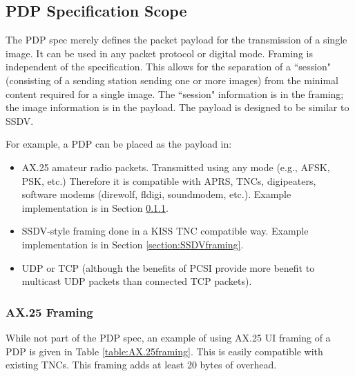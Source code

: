 \documentclass[letterpaper]{article}
\begin{document}
\subsection {PDP Specification Scope}
The PDP spec merely defines the packet payload for the transmission of a single image. It can be used in any packet protocol or digital mode. Framing is independent of the specification. This allows for the separation of a ``session" (consisting of a sending station sending one or more images) from the minimal content required for a single image. The ``session" information is in the framing; the image information is in the payload. The payload is designed to be similar to SSDV.

For example, a PDP can be placed as the payload in:
\begin{itemize}
    \item AX.25 amateur radio packets. Transmitted using any mode (e.g., AFSK, PSK, etc.) Therefore it is compatible with APRS, TNCs, digipeaters, software modems (direwolf, fldigi, soundmodem, etc.). Example implementation is in Section \ref{section:AX.25framing}.
    \item SSDV-style framing done in a KISS TNC compatible way. Example implementation is in Section \ref{section:SSDVframing}.
    \item UDP or TCP (although the benefits of PCSI provide more benefit to multicast UDP packets than connected TCP packets).
\end{itemize}

\subsubsection{AX.25 Framing}\label{section:AX.25framing}
While not part of the PDP spec, an example of using AX.25 UI framing \cite{ax25} of a PDP is given in Table \ref{table:AX.25framing}. This is easily compatible with existing TNCs. This framing adds at least 20 bytes of overhead. 
\end{document}

